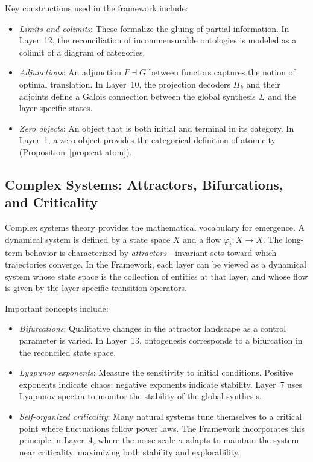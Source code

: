 Key constructions used in the framework include:
\begin{itemize}
    \item \emph{Limits and colimits}: These formalize the gluing of partial information. In Layer~12, the reconciliation of incommensurable ontologies is modeled as a colimit of a diagram of categories.
    \item \emph{Adjunctions}: An adjunction $F \dashv G$ between functors captures the notion of optimal translation. In Layer~10, the projection decoders $\Pi_k$ and their adjoints define a Galois connection between the global synthesis $\Sigma$ and the layer-specific states.
    \item \emph{Zero objects}: An object that is both initial and terminal in its category. In Layer~1, a zero object provides the categorical definition of atomicity (Proposition~\ref{prop:cat-atom}).
\end{itemize}

\subsection{Complex Systems: Attractors, Bifurcations, and Criticality}
Complex systems theory provides the mathematical vocabulary for emergence. A dynamical system is defined by a state space $X$ and a flow $\varphi_t: X \to X$. The long-term behavior is characterized by \emph{attractors}---invariant sets toward which trajectories converge. In the \Apeiron{} Framework, each layer can be viewed as a dynamical system whose state space is the collection of entities at that layer, and whose flow is given by the layer-specific transition operators.

Important concepts include:
\begin{itemize}
    \item \emph{Bifurcations}: Qualitative changes in the attractor landscape as a control parameter is varied. In Layer~13, ontogenesis corresponds to a bifurcation in the reconciled state space.
    \item \emph{Lyapunov exponents}: Measure the sensitivity to initial conditions. Positive exponents indicate chaos; negative exponents indicate stability. Layer~7 uses Lyapunov spectra to monitor the stability of the global synthesis.
    \item \emph{Self-organized criticality}: Many natural systems tune themselves to a critical point where fluctuations follow power laws. The \Apeiron{} Framework incorporates this principle in Layer~4, where the noise scale $\sigma$ adapts to maintain the system near criticality, maximizing both stability and explorability.
\end{itemize}


